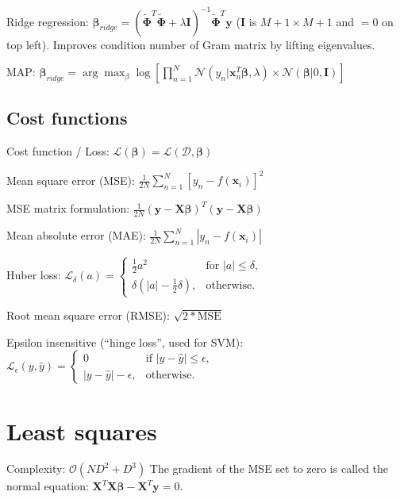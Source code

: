 \documentclass[10pt,a4paper,landscape]{extarticle}
\renewcommand{\bf}[1]{\ensuremath{\mathbf{#1}}}
\newcommand{\bbeta}{\boldsymbol\beta}
\begin{document}
\begin{multicols*}{4}
Ridge regression: $\bbeta_{ridge} = ( \tilde{\boldsymbol\Phi}^T \tilde{\boldsymbol\Phi} + \lambda \boldsymbol I)^{-1} \tilde{\boldsymbol\Phi}^T \boldsymbol y$ ($\boldsymbol I$ is $M+1 \times M+1$ and $=0$ on top left). Improves condition number of Gram matrix by lifting eigenvalues.

MAP: $\bbeta_{ridge} = \arg \max_\beta \log[\prod\limits_{n=1}^N \mathcal{N}(y_n | \bf{x}_n^T\bbeta, \lambda) \times \mathcal{N}(\bbeta|0,\bf{I})]$

\subsection{Cost functions}

Cost function / Loss: $\mathcal{L}(\bbeta) = \mathcal{L}(\mathcal{D},\bbeta)$

Mean square error (MSE): $\frac{1}{2N} \sum_{n=1}^{N}\left[y_n-f(\bf{x}_i) \right]^2$

MSE matrix formulation: $\frac{1}{2N} (\bf{y - X \bbeta})^T (\bf{y - X \bbeta})$

Mean absolute error (MAE): $\frac{1}{2N} \sum_{n=1}^{N}\left | y_n-f(\bf{x}_i) \right |$

Huber loss: $\mathcal{L}_\delta (a) = \begin{cases}
\frac{1}{2}{a^2}                   & \text{for } |a| \le \delta, \\
\delta (|a| - \frac{1}{2}\delta ), & \text{otherwise.}
\end{cases}$

Root mean square error (RMSE): $\sqrt{2 * \text{MSE}}$

Epsilon insensitive (``hinge loss'', used for SVM):
$\mathcal{L}_{\epsilon}(y, \hat{y}) = \begin{cases}
0                   & \text{if } |y - \hat y| \le \epsilon, \\
|y - \hat y| - \epsilon, & \text{otherwise.}
\end{cases}$

\section{Least squares}
Complexity: $\mathcal{O}(ND^2 + D^3)$
The gradient of the MSE set to zero is called the normal equation:
$  \bf{X}^T \bf{X} \bbeta - \bf{X}^T \bf{y} = 0$.


\end{multicols*}
\end{document}
